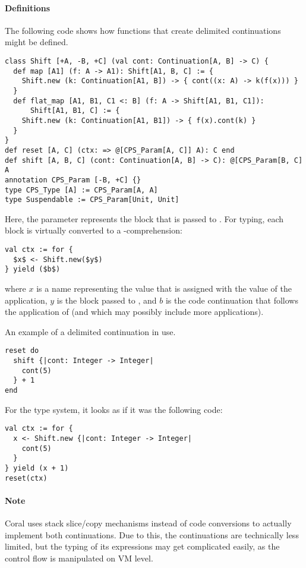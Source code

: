 \paragraph{Definitions}
The following code shows how functions that create delimited continuations might be defined. 
\begin{lstlisting}
class Shift [+A, -B, +C] (val cont: Continuation[A, B] -> C) {
  def map [A1] (f: A -> A1): Shift[A1, B, C] := {
    Shift.new (k: Continuation[A1, B]) -> { cont((x: A) -> k(f(x))) }
  }
  def flat_map [A1, B1, C1 <: B] (f: A -> Shift[A1, B1, C1]): 
      Shift[A1, B1, C] := {
    Shift.new (k: Continuation[A1, B1]) -> { f(x).cont(k) }
  }
}
def reset [A, C] (ctx: => @[CPS_Param[A, C]] A): C end
def shift [A, B, C] (cont: Continuation[A, B] -> C): @[CPS_Param[B, C] A
annotation CPS_Param [-B, +C] {}
type CPS_Type [A] := CPS_Param[A, A]
type Suspendable := CPS_Param[Unit, Unit]
\end{lstlisting}

Here, the  parameter represents the block that is passed to . For typing, each  block is virtually converted to a -comprehension:
\begin{lstlisting}
val ctx := for {
  $x$ <- Shift.new($y$)
} yield ($b$)
\end{lstlisting}
where $x$ is a name representing the value that is assigned with the value of the  application, $y$ is the block passed to , and $b$ is the code continuation that follows the application of  (and which may possibly include more  applications). 

\example An example of a delimited continuation in use. 
\begin{lstlisting}
reset do
  shift {|cont: Integer -> Integer|
    cont(5)
  } + 1
end
\end{lstlisting}
For the type system, it looks as if it was the following code:
\begin{lstlisting}
val ctx := for {
  x <- Shift.new {|cont: Integer -> Integer|
    cont(5)
  }
} yield (x + 1)
reset(ctx)
\end{lstlisting}

\paragraph{Note}
Coral uses stack slice/copy mechanisms instead of code conversions to actually implement both continuations. Due to this, the continuations are technically less limited, but the typing of its expressions may get complicated easily, as the control flow is manipulated on VM level.

